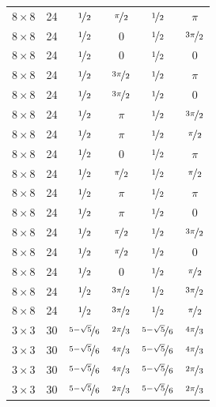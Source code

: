 \documentclass{article}
\begin{document}
\begin{longtable}{cccccc}
$8 \times 8$ & 24 & $\nicefrac{1}{2}$ & $\nicefrac{\pi}{2}$ & $\nicefrac{1}{2}$ & $\pi$ \\
$8 \times 8$ & 24 & $\nicefrac{1}{2}$ & 0 & $\nicefrac{1}{2}$ & $\nicefrac{3\pi}{2}$ \\
$8 \times 8$ & 24 & $\nicefrac{1}{2}$ & 0 & $\nicefrac{1}{2}$ & 0 \\
$8 \times 8$ & 24 & $\nicefrac{1}{2}$ & $\nicefrac{3\pi}{2}$ & $\nicefrac{1}{2}$ & $\pi$ \\
$8 \times 8$ & 24 & $\nicefrac{1}{2}$ & $\nicefrac{3\pi}{2}$ & $\nicefrac{1}{2}$ & 0 \\
$8 \times 8$ & 24 & $\nicefrac{1}{2}$ & $\pi$ & $\nicefrac{1}{2}$ & $\nicefrac{3\pi}{2}$ \\
$8 \times 8$ & 24 & $\nicefrac{1}{2}$ & $\pi$ & $\nicefrac{1}{2}$ & $\nicefrac{\pi}{2}$ \\
$8 \times 8$ & 24 & $\nicefrac{1}{2}$ & 0 & $\nicefrac{1}{2}$ & $\pi$ \\
$8 \times 8$ & 24 & $\nicefrac{1}{2}$ & $\nicefrac{\pi}{2}$ & $\nicefrac{1}{2}$ & $\nicefrac{\pi}{2}$ \\
$8 \times 8$ & 24 & $\nicefrac{1}{2}$ & $\pi$ & $\nicefrac{1}{2}$ & $\pi$ \\
$8 \times 8$ & 24 & $\nicefrac{1}{2}$ & $\pi$ & $\nicefrac{1}{2}$ & 0 \\
$8 \times 8$ & 24 & $\nicefrac{1}{2}$ & $\nicefrac{\pi}{2}$ & $\nicefrac{1}{2}$ & $\nicefrac{3\pi}{2}$ \\
$8 \times 8$ & 24 & $\nicefrac{1}{2}$ & $\nicefrac{\pi}{2}$ & $\nicefrac{1}{2}$ & 0 \\
$8 \times 8$ & 24 & $\nicefrac{1}{2}$ & 0 & $\nicefrac{1}{2}$ & $\nicefrac{\pi}{2}$ \\
$8 \times 8$ & 24 & $\nicefrac{1}{2}$ & $\nicefrac{3\pi}{2}$ & $\nicefrac{1}{2}$ & $\nicefrac{3\pi}{2}$ \\
$8 \times 8$ & 24 & $\nicefrac{1}{2}$ & $\nicefrac{3\pi}{2}$ & $\nicefrac{1}{2}$ & $\nicefrac{\pi}{2}$ \\
$3 \times 3$ & 30 & $\nicefrac{5-\sqrt{5}}{6}$ & $\nicefrac{2\pi}{3}$ & $\nicefrac{5-\sqrt{5}}{6}$ & $\nicefrac{4\pi}{3}$ \\
$3 \times 3$ & 30 & $\nicefrac{5-\sqrt{5}}{6}$ & $\nicefrac{4\pi}{3}$ & $\nicefrac{5-\sqrt{5}}{6}$ & $\nicefrac{4\pi}{3}$ \\
$3 \times 3$ & 30 & $\nicefrac{5-\sqrt{5}}{6}$ & $\nicefrac{4\pi}{3}$ & $\nicefrac{5-\sqrt{5}}{6}$ & $\nicefrac{2\pi}{3}$ \\
$3 \times 3$ & 30 & $\nicefrac{5-\sqrt{5}}{6}$ & $\nicefrac{2\pi}{3}$ & $\nicefrac{5-\sqrt{5}}{6}$ & $\nicefrac{2\pi}{3}$ \\

\end{longtable}
\end{document}
